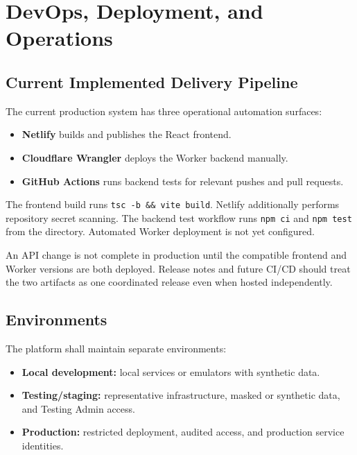 \documentclass[11pt,a4paper,oneside]{report}
\begin{document}
\chapter{DevOps, Deployment, and Operations}

\section{Current Implemented Delivery Pipeline}

The current production system has three operational automation surfaces:

\begin{itemize}
  \item \textbf{Netlify} builds and publishes the React frontend.
  \item \textbf{Cloudflare Wrangler} deploys the Worker backend manually.
  \item \textbf{GitHub Actions} runs backend tests for relevant pushes and pull requests.
\end{itemize}

The frontend build runs \texttt{tsc -b \&\& vite build}. Netlify additionally performs repository secret scanning. The backend test workflow runs \texttt{npm ci} and \texttt{npm test} from the  directory. Automated Worker deployment is not yet configured.

\begin{warningbox}
An API change is not complete in production until the compatible frontend and Worker versions are both deployed. Release notes and future CI/CD should treat the two artifacts as one coordinated release even when hosted independently.
\end{warningbox}

\section{Environments}

The platform shall maintain separate environments:

\begin{itemize}
  \item \textbf{Local development:} local services or emulators with synthetic data.
  \item \textbf{Testing/staging:} representative infrastructure, masked or synthetic data, and Testing Admin access.
  \item \textbf{Production:} restricted deployment, audited access, and production service identities.
\end{itemize}
\end{document}
